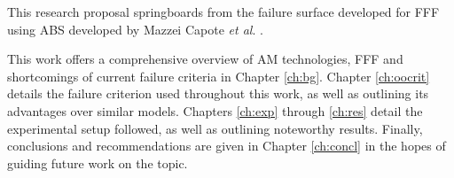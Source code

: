 \documentclass[main.tex]{subfiles}
\begin{document}
This research proposal springboards from the failure surface developed for FFF using ABS developed by Mazzei Capote \emph{et al}. \cite{MazzeiCapote2019}. %

This work offers a comprehensive overview of AM technologies, FFF and shortcomings of current failure criteria in Chapter \ref{ch:bg}. Chapter \ref{ch:oocrit} details the failure criterion used throughout this work, as well as outlining its advantages over similar models. Chapters \ref{ch:exp} through \ref{ch:res} detail the experimental setup followed, as well as outlining noteworthy results. Finally, conclusions and recommendations are given in Chapter \ref{ch:concl} in the hopes of guiding future work on the topic. %

% 
%
%
%
%
%
%
\end{document}
